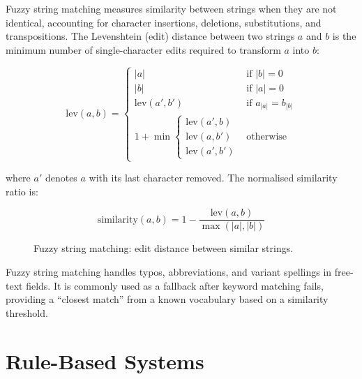 \documentclass[10pt,a4paper]{article}
\begin{document}
Fuzzy string matching measures similarity between strings when they are not identical, accounting for character insertions, deletions, substitutions, and transpositions. The Levenshtein (edit) distance between two strings $a$ and $b$ is the minimum number of single-character edits required to transform $a$ into $b$:

\begin{equation}
\text{lev}(a, b) = \begin{cases}
|a| & \text{if } |b| = 0 \\
|b| & \text{if } |a| = 0 \\
\text{lev}(a', b') & \text{if } a_{|a|} = b_{|b|} \\
1 + \min\begin{cases} \text{lev}(a', b) \\
\text{lev}(a, b') \\
\text{lev}(a', b') \end{cases} & \text{otherwise}
\end{cases}
\label{eq:levenshtein}
\end{equation}

where $a'$ denotes $a$ with its last character removed. The normalised similarity ratio is:

\begin{equation}
\text{similarity}(a, b) = 1 - \frac{\text{lev}(a, b)}{\max(|a|, |b|)}
\label{eq:similarity-ratio}
\end{equation}

\begin{figure}[H]
    \centering
    \caption{Fuzzy string matching: edit distance between similar strings.}
    \label{fig:fuzzy-matching}
\end{figure}

Fuzzy string matching handles typos, abbreviations, and variant spellings in free-text fields. It is commonly used as a fallback after keyword matching fails, providing a ``closest match'' from a known vocabulary based on a similarity threshold.

\section{Rule-Based Systems}
\label{sec:rule-based-systems}
\end{document}
